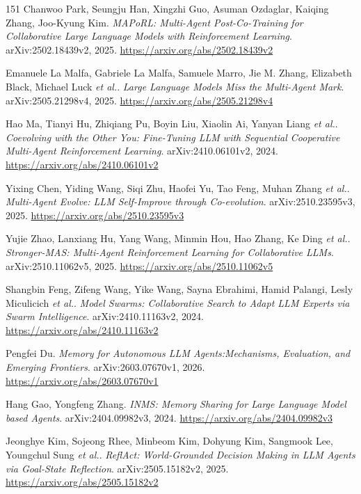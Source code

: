 \documentclass[11pt,a4paper]{article}
\begin{document}
\begin{thebibliography}{151}
Chanwoo Park, Seungju Han, Xingzhi Guo, Asuman Ozdaglar, Kaiqing Zhang, Joo-Kyung Kim.
\newblock \emph{MAPoRL: Multi-Agent Post-Co-Training for Collaborative Large Language Models with Reinforcement Learning}.
\newblock arXiv:2502.18439v2, 2025.
\newblock \url{https://arxiv.org/abs/2502.18439v2}

Emanuele La Malfa, Gabriele La Malfa, Samuele Marro, Jie M. Zhang, Elizabeth Black, Michael Luck \emph{et al.}.
\newblock \emph{Large Language Models Miss the Multi-Agent Mark}.
\newblock arXiv:2505.21298v4, 2025.
\newblock \url{https://arxiv.org/abs/2505.21298v4}

Hao Ma, Tianyi Hu, Zhiqiang Pu, Boyin Liu, Xiaolin Ai, Yanyan Liang \emph{et al.}.
\newblock \emph{Coevolving with the Other You: Fine-Tuning LLM with Sequential Cooperative Multi-Agent Reinforcement Learning}.
\newblock arXiv:2410.06101v2, 2024.
\newblock \url{https://arxiv.org/abs/2410.06101v2}

Yixing Chen, Yiding Wang, Siqi Zhu, Haofei Yu, Tao Feng, Muhan Zhang \emph{et al.}.
\newblock \emph{Multi-Agent Evolve: LLM Self-Improve through Co-evolution}.
\newblock arXiv:2510.23595v3, 2025.
\newblock \url{https://arxiv.org/abs/2510.23595v3}

Yujie Zhao, Lanxiang Hu, Yang Wang, Minmin Hou, Hao Zhang, Ke Ding \emph{et al.}.
\newblock \emph{Stronger-MAS: Multi-Agent Reinforcement Learning for Collaborative LLMs}.
\newblock arXiv:2510.11062v5, 2025.
\newblock \url{https://arxiv.org/abs/2510.11062v5}

Shangbin Feng, Zifeng Wang, Yike Wang, Sayna Ebrahimi, Hamid Palangi, Lesly Miculicich \emph{et al.}.
\newblock \emph{Model Swarms: Collaborative Search to Adapt LLM Experts via Swarm Intelligence}.
\newblock arXiv:2410.11163v2, 2024.
\newblock \url{https://arxiv.org/abs/2410.11163v2}

Pengfei Du.
\newblock \emph{Memory for Autonomous LLM Agents:Mechanisms, Evaluation, and Emerging Frontiers}.
\newblock arXiv:2603.07670v1, 2026.
\newblock \url{https://arxiv.org/abs/2603.07670v1}

Hang Gao, Yongfeng Zhang.
\newblock \emph{INMS: Memory Sharing for Large Language Model based Agents}.
\newblock arXiv:2404.09982v3, 2024.
\newblock \url{https://arxiv.org/abs/2404.09982v3}

Jeonghye Kim, Sojeong Rhee, Minbeom Kim, Dohyung Kim, Sangmook Lee, Youngchul Sung \emph{et al.}.
\newblock \emph{ReflAct: World-Grounded Decision Making in LLM Agents via Goal-State Reflection}.
\newblock arXiv:2505.15182v2, 2025.
\newblock \url{https://arxiv.org/abs/2505.15182v2}


\end{thebibliography}
\end{document}
